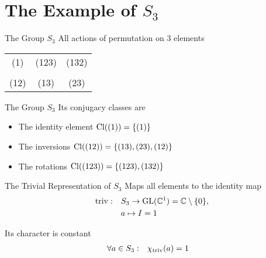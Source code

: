 
\section{The Example of $S_3$}

\begin{frame}{The Group $S_3$}
    \large
    All actions of permutation on $3$ elements

    \pause
    \vspace{2em}
    \centering
    \begin{tabular}{c c c}
        (1)  & (123) & (132) \\\\
        (12) & (13)  & (23)
    \end{tabular}
\end{frame}

%    

\begin{frame}{The Group $S_3$}
    \large
    Its conjugacy classes are

    \pause
    \vspace{1em}
    \begin{itemize}
        \item The identity element \hspace*{\fill} $\operatorname{Cl}((1)) = \{(1)\}$ \pause
        \item The inversions \hspace*{\fill} $\operatorname{Cl}((12)) = \{(13), (23), (12)\}$ \pause
        \item The rotations \hspace*{\fill} $\operatorname{Cl}((123)) = \{(123), (132)\}$
    \end{itemize}
\end{frame}

\begin{frame}{The Trivial Representation of $S_3$}
    \large
    Maps all elements to the identity map
    \pause
    \begin{align*}
        \operatorname{triv}: \quad & S_3 \to \operatorname{GL}(\mathbb{C}^1) = \mathbb{C} \setminus \{0\}, \\
        & a \mapsto I = 1
    \end{align*}

    \pause
    Its character is constant
    \begin{align*}
        \forall a \in S_3: \quad & \chi_{\operatorname{triv}}(a) = 1
    \end{align*}
\end{frame}

